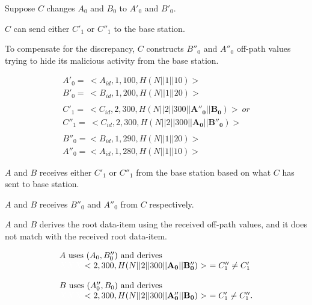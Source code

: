\documentclass[%
  slidesonly,%
  semlayer%
  ]{seminar}                                  %
\begin{document}
\begin{slide}
        Suppose $C$ changes $A_{0}$ and $B_{0}$ to $A'_{0}$ and $B'_{0}$.

        $C$ can send either $C'_{1}$ or $C''_{1}$ to the base station.
        
        To compensate for the discrepancy, $C$ constructs $B''_{0}$ and $A''_{0}$ off-path values trying to hide its malicious activity from the base station.

        \begin{equation*}
          \begin{array}{l}
            A'_{0} =\ <A_{id},1,100, H(N||1||10)>\\
            B'_{0} =\ <B_{id},1,200, H(N||1||20)>\\
            \\
            C'_{1} =\ <C_{id},2,300, H(N||2||300||\mathbf{A''_{0}}||\mathbf{B_{0}})>\ or \\ 
            C''_{1} =\ <C_{id},2,300, H(N||2||300||\mathbf{A_{0}}||\mathbf{B''_{0}})>\\
            \\
            B''_{0} = <B_{id},1,290,H(N||1||20)>\\
            A''_{0} = <A_{id},1,280,H(N||1||10)>
          \end{array}
        \end{equation*}
        \vfill
        \clearpage

        $A$ and $B$ receives either $C'_{1}$ or $C''_{1}$ from the base station based on what $C$ has sent to base station.

        $A$ and $B$ receives $B''_{0}$ and $A''_{0}$ from $C$ respectively.

        $A$ and $B$ derives the root data-item using the received off-path values, and it does not match with the received root data-item.

        \begin{equation*}
          \begin{array}{l}
            A\ \mbox{uses}\ (A_{0}, B''_{0})\ \mbox{and derives}\\
            \textcolor{white}{XXX} <2,300,H(N||2||300||\mathbf{A_{0}}||\mathbf{B''_{0}})>\  = C''_{1} \neq C'_{1} \\
            \\
            B\ \mbox{uses}\ (A''_{0}, B_{0})\ \mbox{and derives}\\
            \textcolor{white}{XXX} <2,300,H(N||2||300||\mathbf{A''_{0}}||\mathbf{B_{0}})>\ = C'_{1} \neq C''_{1}.
          \end{array}
        \end{equation*}


\end{slide}
\end{document}
